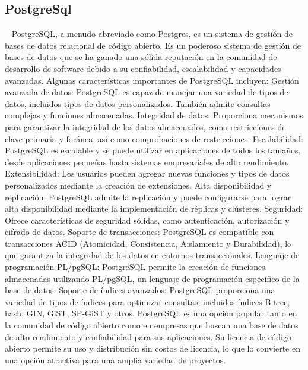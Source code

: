 \subsection{PostgreSql}~\cite{juba2015learning}
PostgreSQL, a menudo abreviado como Postgres, es un sistema de gestión de bases de datos relacional de código abierto. Es un poderoso sistema de gestión de bases de datos que se ha ganado una sólida reputación en la comunidad de desarrollo de software debido a su confiabilidad, escalabilidad y capacidades avanzadas.
Algunas características importantes de PostgreSQL incluyen:
Gestión avanzada de datos: PostgreSQL es capaz de manejar una variedad de tipos de datos, incluidos tipos de datos personalizados. También admite consultas complejas y funciones almacenadas.
Integridad de datos: Proporciona mecanismos para garantizar la integridad de los datos almacenados, como restricciones de clave primaria y foránea, así como comprobaciones de restricciones.
Escalabilidad: PostgreSQL es escalable y se puede utilizar en aplicaciones de todos los tamaños, desde aplicaciones pequeñas hasta sistemas empresariales de alto rendimiento.
Extensibilidad: Los usuarios pueden agregar nuevas funciones y tipos de datos personalizados mediante la creación de extensiones.
Alta disponibilidad y replicación: PostgreSQL admite la replicación y puede configurarse para lograr alta disponibilidad mediante la implementación de réplicas y clústeres.
Seguridad: Ofrece características de seguridad sólidas, como autenticación, autorización y cifrado de datos.
Soporte de transacciones: PostgreSQL es compatible con transacciones ACID (Atomicidad, Consistencia, Aislamiento y Durabilidad), lo que garantiza la integridad de los datos en entornos transaccionales.
Lenguaje de programación PL/pgSQL: PostgreSQL permite la creación de funciones almacenadas utilizando PL/pgSQL, un lenguaje de programación específico de la base de datos.
Soporte de índices avanzados: PostgreSQL proporciona una variedad de tipos de índices para optimizar consultas, incluidos índices B-tree, hash, GIN, GiST, SP-GiST y otros.
PostgreSQL es una opción popular tanto en la comunidad de código abierto como en empresas que buscan una base de datos de alto rendimiento y confiabilidad para sus aplicaciones. Su licencia de código abierto permite su uso y distribución sin costos de licencia, lo que lo convierte en una opción atractiva para una amplia variedad de proyectos.


